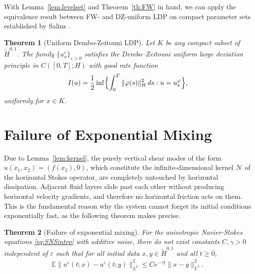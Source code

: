 \documentclass[11pt,a4paper,reqno]{amsart}
\newtheorem{theorem}{Theorem}[section]
\theoremstyle{definition}
\newtheorem{remark}[theorem]{Remark}
\begin{document}
With Lemma~\ref{lem:levelset} and Theorem~\ref{th:FW} in hand, we can apply the
equivalence result between FW- and DZ-uniform LDP on compact parameter sets
established by Salins \cite{Salins}.

\begin{theorem}[Uniform Dembo-Zeitouni LDP]\label{th:mainLDP}
  Let $K$ be any compact subset of $\widetilde H^{0,1}$.
  The family $\{ u_x^\varepsilon \}_{\varepsilon>0}$ satisfies the Dembo--Zeitouni
  uniform large deviation principle in $C([0,T];H)$ with good rate function
  \[
    I(u) = \frac12 \inf\Bigl\{ \int_0^T \|\varphi(s)\|_H^2\,ds :
      u = u_x^\varphi \Bigr\},
  \]
  uniformly for $x\in K$.
\end{theorem}



\section{Failure of Exponential Mixing}\label{sec:mixing}
Due to Lemma~\ref{lem:kernel}, the purely vertical shear modes of the form
$u(x_1,x_2)=(f(x_2),0)$, which constitute the infinite-dimensional kernel
$\mathcal N$ of the horizontal Stokes operator, are completely untouched by
horizontal dissipation. Adjacent fluid layers slide past each other without producing
horizontal velocity gradients, and therefore no horizontal friction acts on
them. This is the fundamental reason why the system cannot forget its initial
conditions exponentially fast, as the following theorem makes precise.

\begin{theorem}[Failure of exponential mixing]\label{th:noExpMix}
  For the anisotropic Navier-Stokes equations \eqref{eq:SNSintro} with additive
  noise, there do not exist constants $C,\gamma>0$ independent of
  $\varepsilon$ such that for all initial data $x,y\in\widetilde H^{0,1}$
  and all $t\ge 0$,
  \begin{align}\label{eq:assumed_mixing}
    \mathbb{E}\|u^\varepsilon(t;x) - u^\varepsilon(t;y)\|_{L^2}^2
    \le C e^{-\gamma t} \|x-y\|_{L^2}^2 .
  \end{align}
\end{theorem}
\end{document}

